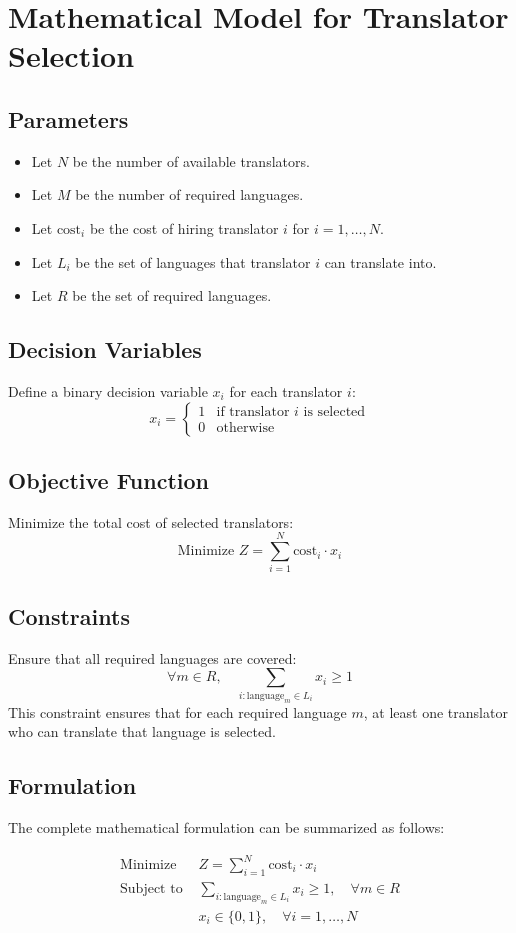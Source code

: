 \documentclass{article}
\begin{document}
\section*{Mathematical Model for Translator Selection}

\subsection*{Parameters}
\begin{itemize}
    \item Let \( N \) be the number of available translators.
    \item Let \( M \) be the number of required languages.
    \item Let \( \text{cost}_i \) be the cost of hiring translator \( i \) for \( i = 1, \ldots, N \).
    \item Let \( L_i \) be the set of languages that translator \( i \) can translate into.
    \item Let \( R \) be the set of required languages.
\end{itemize}

\subsection*{Decision Variables}
Define a binary decision variable \( x_i \) for each translator \( i \):
\[
x_i =
\begin{cases}
1 & \text{if translator } i \text{ is selected} \\
0 & \text{otherwise}
\end{cases}
\]

\subsection*{Objective Function}
Minimize the total cost of selected translators:
\[
\text{Minimize } Z = \sum_{i=1}^{N} \text{cost}_i \cdot x_i
\]

\subsection*{Constraints}
Ensure that all required languages are covered:
\[
\forall m \in R, \quad \sum_{i: \text{language}_m \in L_i} x_i \geq 1
\]
This constraint ensures that for each required language \( m \), at least one translator who can translate that language is selected.

\subsection*{Formulation}
The complete mathematical formulation can be summarized as follows:

\begin{align*}
\text{Minimize } & Z = \sum_{i=1}^{N} \text{cost}_i \cdot x_i \\
\text{Subject to } & \sum_{i: \text{language}_m \in L_i} x_i \geq 1, \quad \forall m \in R \\
& x_i \in \{0, 1\}, \quad \forall i = 1, \ldots, N
\end{align*}
\end{document}
